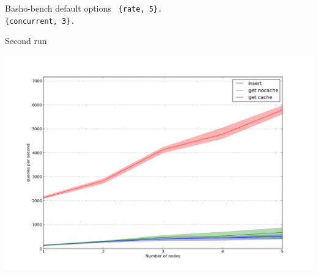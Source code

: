 \documentclass[14pt]{beamer}
\begin{document}
\begin{frame}{Basho-bench default options}
    \tt{
        \{rate, 5\}. \\
        \{concurrent, 3\}.
    }
\end{frame}

\begin{frame}{Second run}
    \begin{center}
        \includegraphics[height=0.8\textheight]{sspbench_cache.png}
    \end{center}
\end{frame}
\end{document}
